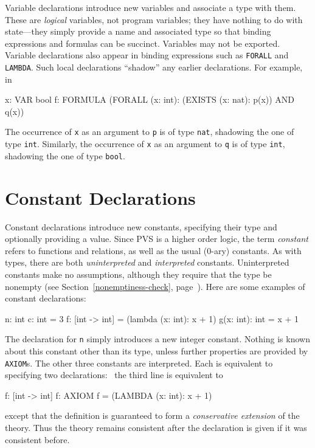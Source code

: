 Variable declarations introduce new variables and associate a type with
them.  These are \emph{logical} variables, not program variables; they
have nothing to do with state---they simply provide a name and associated
type so that binding expressions and formulas can be succinct.
Variables may not be exported.  Variable
declarations also appear in binding expressions such as \texttt{FORALL} and
\texttt{LAMBDA}.  Such local declarations ``shadow'' any earlier
declarations.  For example, in
\begin{pvsex}
  x: VAR bool
  f: FORMULA (FORALL (x: int): (EXISTS (x: nat): p(x)) AND q(x))
\end{pvsex}
%
The occurrence of \texttt{x} as an argument to \texttt{p} is of type
\texttt{nat}, shadowing the one of type \texttt{int}.  Similarly, the
occurrence of \texttt{x} as an argument to \texttt{q} is of type
\texttt{int}, shadowing the one of type \texttt{bool}.


\section{Constant Declarations}\label{constants}

Constant declarations introduce new constants, specifying their type and
optionally providing a value.  Since PVS is a higher order logic, the term
\emph{constant} refers to functions and relations, as well as the usual
(0-ary) constants.  As with types, there are both \emph{uninterpreted} and
\emph{interpreted} %
 constants.  Uninterpreted constants make
no assumptions, although they require that the type be nonempty (see
Section~\ref{nonemptiness-check}, page~\pageref{nonemptiness-check}).
Here are some examples of constant declarations:
\begin{pvsex}
  n: int
  c: int = 3
  f: [int -> int] = (lambda (x: int): x + 1)
  g(x: int): int = x + 1
\end{pvsex}
%
The declaration for \texttt{n} simply introduces a new integer constant.
Nothing is known about this constant other than its type, unless further
properties are provided by \texttt{AXIOM}s.  The other three constants are
interpreted.  Each is equivalent to specifying two declarations: \eg\
the third line is equivalent to
\begin{pvsex}
  f: [int -> int]
  f: AXIOM  f = (LAMBDA (x: int): x + 1)
\end{pvsex}
%
except that the definition is guaranteed to form a \emph{conservative
extension}\index{conservative extension} of the theory.  Thus the
theory remains consistent after the declaration is given if it was
consistent before.

